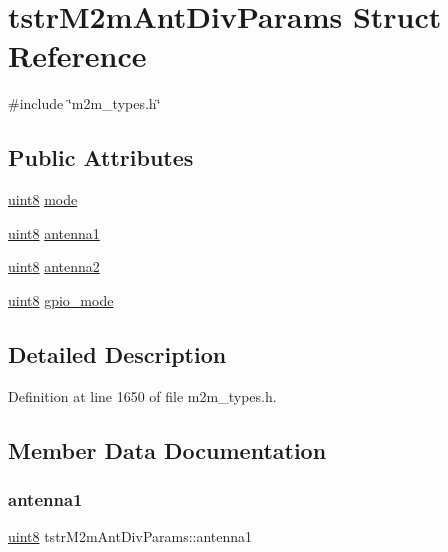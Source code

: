 \hypertarget{structtstrM2mAntDivParams}{}\section{tstr\+M2m\+Ant\+Div\+Params Struct Reference}
\label{structtstrM2mAntDivParams}


{\ttfamily \#include \char`\"{}m2m\+\_\+types.\+h\char`\"{}}

\subsection*{Public Attributes}
\begin{DoxyCompactItemize}
\item 
\hyperlink{group__DataT_ga4df709a77647e870bbf1d955b8edc9a6}{uint8} \hyperlink{structtstrM2mAntDivParams_aba1e7d2c9097e415a542ce1f0da60f34}{mode}
\item 
\hyperlink{group__DataT_ga4df709a77647e870bbf1d955b8edc9a6}{uint8} \hyperlink{structtstrM2mAntDivParams_a8dd2e1ecd41982e149ce18ef704eec6c}{antenna1}
\item 
\hyperlink{group__DataT_ga4df709a77647e870bbf1d955b8edc9a6}{uint8} \hyperlink{structtstrM2mAntDivParams_a0fc2c68970b7b3043212ecb31aca7b6e}{antenna2}
\item 
\hyperlink{group__DataT_ga4df709a77647e870bbf1d955b8edc9a6}{uint8} \hyperlink{structtstrM2mAntDivParams_aac8968943b7f201b4645522d7d7e9176}{gpio\+\_\+mode}
\end{DoxyCompactItemize}


\subsection{Detailed Description}


Definition at line 1650 of file m2m\+\_\+types.\+h.



\subsection{Member Data Documentation}
\mbox{\label{structtstrM2mAntDivParams_a8dd2e1ecd41982e149ce18ef704eec6c}} 
\subsubsection{\texorpdfstring{antenna1}{antenna1}}
{\footnotesize\ttfamily \hyperlink{group__DataT_ga4df709a77647e870bbf1d955b8edc9a6}{uint8} tstr\+M2m\+Ant\+Div\+Params\+::antenna1}

